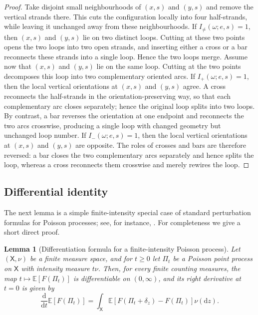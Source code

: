 \documentclass[11pt]{article}
\newtheorem{lemma}[theorem]{Lemma}
\theoremstyle{remark}
\theoremstyle{plain}
\newcommand{\Ebb}{\mathbb{E}}
\newcommand{\1}{\mathbbm{1}}
\newcommand{\dd}{\mathrm{d}}
\begin{document}
\begin{proof}
Take disjoint small neighbourhoods of \((x,s)\) and \((y,s)\) and remove the
vertical strands there. This cuts the configuration locally into four half-strands,
while leaving it unchanged away from these neighbourhoods.
If \(I_{\neq}(\omega;e,s)=1\), then \((x,s)\) and \((y,s)\) lie on two distinct loops.
Cutting at these two points opens the two loops into two open strands, and inserting
either a cross or a bar reconnects these strands into a single loop. Hence the two
loops merge.
Assume now that \((x,s)\) and \((y,s)\) lie on the same loop. Cutting at the two
points decomposes this loop into two complementary oriented arcs.
If \(I_+(\omega;e,s)=1\), then the local vertical orientations at \((x,s)\) and
\((y,s)\) agree. A cross reconnects the half-strands in the orientation-preserving
way, so that each complementary arc closes separately; hence the original loop splits
into two loops. By contrast, a bar reverses the orientation at one endpoint and
reconnects the two arcs crosswise, producing a single loop with changed geometry
but unchanged loop number.
If \(I_-(\omega;e,s)=1\), then the local vertical orientations at \((x,s)\) and
\((y,s)\) are opposite. The roles of crosses and bars are therefore reversed: a bar
closes the two complementary arcs separately and hence splits the loop, whereas a
cross reconnects them crosswise and merely rewires the loop.
\end{proof}


\subsection{Differential identity}

The next lemma is a simple finite-intensity special case of standard perturbation
formulas for Poisson processes; see, for instance,
\cite[Section~6]{Last2014Perturbation}. For completeness we give a short direct proof.

\begin{lemma}[Differentiation formula for a finite-intensity Poisson process]
\label{lem:poisson-diff}
Let \((\mathsf X,\nu)\) be a finite measure space, and for \(t\ge 0\) let \(\Pi_t\) be
a Poisson point process on \(\mathsf X\) with intensity measure \(t\nu\). Then, for
every finite counting measures, the map
\(t\mapsto \Ebb[F(\Pi_t)]\) is differentiable on \((0,\infty)\), and its right
derivative at \(t=0\) is given by
\[
\frac{\dd}{\dd t}\Ebb[F(\Pi_t)]
=
\int_{\mathsf X}\Ebb\!\left[F(\Pi_t+\delta_z)-F(\Pi_t)\right]\nu(\dd z).
\]
\end{lemma}
\end{document}
